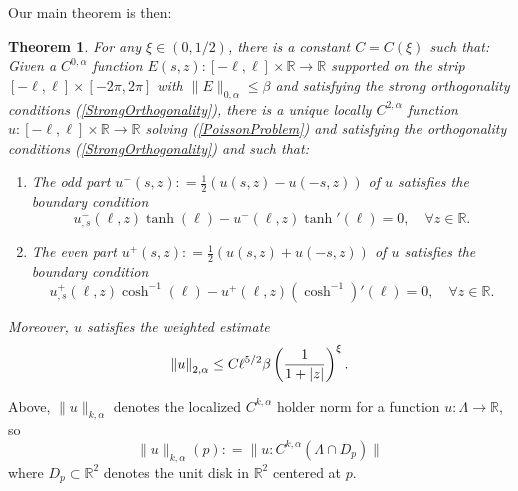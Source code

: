 \documentclass{amsart}
\newtheorem{theorem}{Theorem}
\newcommand{\mb}{\mathbb}
\begin{document}
Our main theorem is then:
 \begin{theorem} \label{RBCSolutionsWeightedControl}
For any $\xi \in (0, 1/2)$, there is a constant $C = C(\xi)$ such that: Given a  $C^{0, \alpha}$ function $E(s, z): [-\ell, \ell] \times \mb{R} \rightarrow \mb{R}$ supported on the strip $[- \ell, \ell] \times [-2 \pi, 2 \pi]$ with $\| E\|_{0, \alpha} \leq \beta$ and satisfying the strong orthogonality conditions (\ref{StrongOrthogonality}), there is a unique locally $C^{2, \alpha}$ function $u: [- \ell, \ell] \times \mb{R}\rightarrow \mb{R}$ solving  (\ref{PoissonProblem}) and satisfying the orthogonality conditions (\ref{StrongOrthogonality}) and such that: 
\begin{enumerate}
\item \label{ODDRBS} The odd part $u^{-}(s ,z) : = \frac{1}{2}\left(u(s, z) - u(-s, z) \right)$ of $u$ satisfies the boundary condition
\[
u^{-}_{, s}(\ell, z) \tanh(\ell) - u^{-}(\ell, z) \tanh'(\ell) = 0, \quad \forall z \in \mb{R}.
\]
\item \label{EVENRBS} The even part $u^{+}(s ,z) : = \frac{1}{2}\left(u(s, z) +u(-s, z) \right)$ of $u$ satisfies the boundary condition
\[
u^{+}_{, s}(\ell, z) \cosh^{-1}(\ell) - u^{+}(\ell, z) \left(\cosh^{-1}\right)'(\ell) = 0, \quad \forall z \in \mb{R}.
\]
\end{enumerate}
Moreover,  $u$ satisfies the weighted estimate
 \begin{align} \notag
\left\| u \right\|_{2, \alpha}  \leq C \ell^{5/2}  \beta \left(\frac{1}{1 + |z|}\right)^{\xi}.
\end{align} 


 \end{theorem}
Above, $\|u\|_{k, \alpha}$ denotes the localized $C^{k, \alpha}$ holder norm for a function $u: \Lambda \rightarrow \mb{R}$, so
\[
\| u\|_{k, \alpha} (p) : = \| u: C^{k, \alpha} (\Lambda \cap D_p) \|
\]
where $D_p \subset \mb{R}^2$ denotes the unit disk in $\mb{R}^2$ centered at $p$. 
\end{document}
